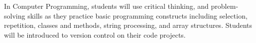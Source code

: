 In Computer Programming, students will use critical thinking, and problem-solving skills
as they practice basic programming constructs including selection, repetition, classes
and methods, string processing, and array structures. Students will be introduced to
version control on their code projects.
